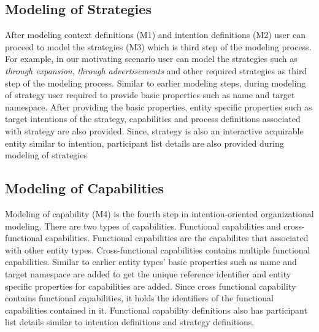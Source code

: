 \subsection{Modeling of Strategies}
After modeling context definitions (M1) and intention definitions (M2) user can proceed to model the strategies (M3) which is third step of the modeling process. For example, in our motivating scenario user can model the strategies such as \textit{through expansion}, \textit{through advertisements} and other required strategies as third step of the modeling process. Similar to earlier modeling steps, during modeling of strategy user required to provide basic properties such as name and target namespace. After providing the basic properties, entity specific properties such as target intentions of the strategy, capabilities and process definitions associated with strategy are also provided. Since, strategy is also an interactive acquirable entity similar to intention, participant list details are also provided during modeling of strategies

\subsection{Modeling of Capabilities}
Modeling of capability (M4) is the fourth step in intention-oriented organizational modeling. There are two types of capabilities. Functional capabilities and cross-functional capabilities. Functional capabilities are the capabilites that associated with other entity types. Cross-functional capabilities contains multiple functional capabilities. Similar to earlier entity types' basic properties such as name and target namespace are added to get the unique reference identifier and entity specific properties for capabilities are added. Since cross functional capability contains functional capabilities, it holds the identifiers of the functional capabilities contained in it. Functional capability definitions also has participant list details similar to intention definitions and strategy definitions. 


